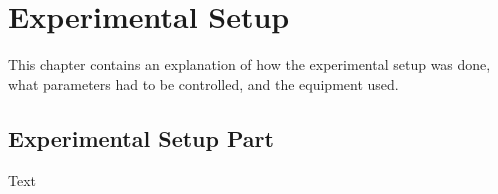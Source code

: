 \documentclass[class=scrbook, crop=false]{standalone}
\begin{document}
\chapter{Experimental Setup} %
\label{Chapter::Experimental_Setup}
   This chapter contains an explanation of how the experimental setup was done, what parameters had to be controlled, and the equipment used.

\section{Experimental Setup Part}
\label{Section::Experimental_Setup_Part}
    Text
\end{document}
